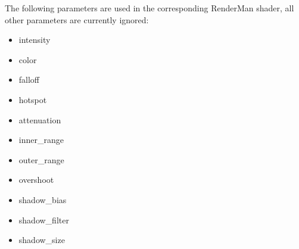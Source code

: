The following parameters are used in the corresponding RenderMan
shader, all other parameters are currently ignored:

\begin{itemize}
\item intensity
\item color
\item falloff
\item hotspot
\item attenuation
\item inner_range
\item outer_range
\item overshoot
\item shadow_bias
\item shadow_filter
\item shadow_size
\end{itemize}
